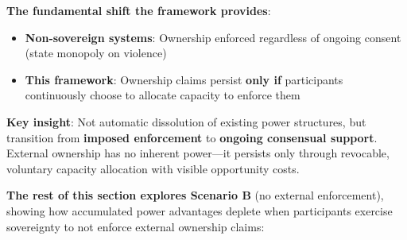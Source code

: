 \documentclass[11pt,a4paper]{article}
\theoremstyle{definition}
\theoremstyle{remark}
\begin{document}
\medskip

\textbf{The fundamental shift the framework provides}:
\begin{itemize}
\item \textbf{Non-sovereign systems}: Ownership enforced regardless of ongoing consent (state monopoly on violence)
\item \textbf{This framework}: Ownership claims persist \textbf{only if} participants continuously choose to allocate capacity to enforce them
\end{itemize}

\textbf{Key insight}: Not automatic dissolution of existing power structures, but transition from \textbf{imposed enforcement} to \textbf{ongoing consensual support}. External ownership has no inherent power—it persists only through revocable, voluntary capacity allocation with visible opportunity costs.

\medskip

\textbf{The rest of this section explores Scenario B} (no external enforcement), showing how accumulated power advantages deplete when participants exercise sovereignty to not enforce external ownership claims:
\end{document}
